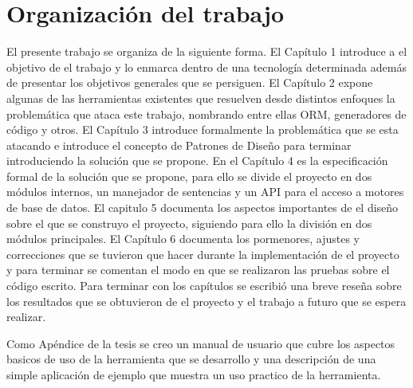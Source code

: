 \section{Organización del trabajo}
%
El presente trabajo se organiza de la siguiente forma. El Capítulo 1 introduce a el objetivo de el trabajo y lo enmarca dentro de una tecnología determinada además de presentar los objetivos generales que se persiguen. El Capítulo 2 expone algunas de las herramientas existentes que resuelven desde distintos enfoques la problemática que ataca este trabajo, nombrando entre ellas ORM, generadores de código y otros. El Capítulo 3 introduce formalmente la problemática que se esta atacando e introduce el concepto de Patrones de Diseño para terminar introduciendo la solución que se propone. En el Capítulo 4 es la especificación formal de la solución que se propone, para ello se divide el proyecto en dos módulos internos, un manejador de sentencias y un API para el acceso a motores de base de datos. El capitulo 5 documenta los aspectos importantes de el diseño sobre el que se construyo el proyecto, siguiendo para ello la división en dos módulos principales. El Capítulo 6 documenta los pormenores, ajustes y correcciones que se tuvieron que hacer durante la implementación de el proyecto y para terminar se comentan el modo en que se realizaron las pruebas sobre el código escrito. Para terminar con los capítulos se escribió una breve reseña sobre los resultados que se obtuvieron de el proyecto y el trabajo a futuro que se espera realizar.

Como Apéndice de la tesis se creo un manual de usuario que cubre los aspectos basicos de uso de la herramienta que se desarrollo y una descripción de una simple aplicación de ejemplo que muestra un uso practico de la herramienta.